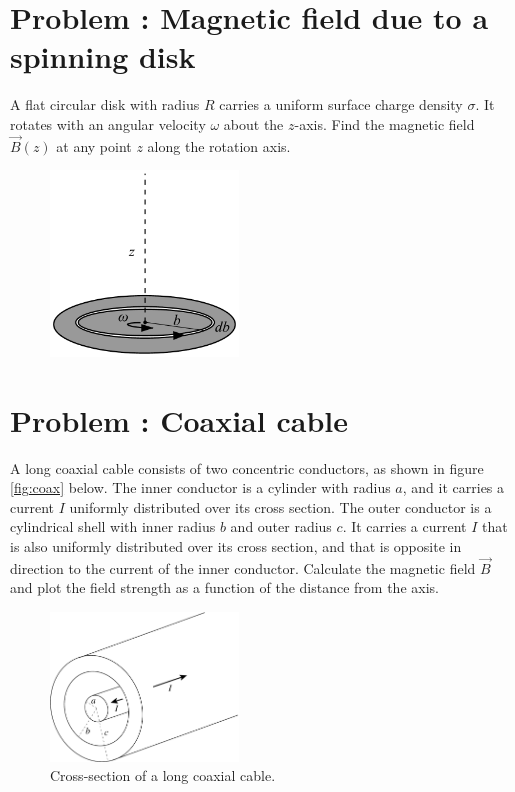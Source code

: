 \documentclass[problems]{esg8022pset}
\begin{document}
\section{Problem \thesection: Magnetic field due to a spinning disk}
  A flat circular disk with radius $R$ carries a uniform surface charge density
  $\sigma$. It rotates with an angular velocity $\omega$ about the $z$-axis.
  Find the magnetic field $\vec{B}(z)$ at any point $z$ along the rotation
  axis.

    \begin{figure}[H]
    \centering
    \includegraphics[width = 5cm]{Spinningdisk}
  \end{figure}
\section{Problem \thesection: Coaxial cable}
  A long coaxial cable consists of two concentric conductors, as shown in figure
  \autoref{fig:coax} below.  The inner conductor is a cylinder with radius $a$,
  and it carries a current $I$ uniformly distributed over its cross section.
  The outer conductor is a cylindrical shell with inner radius $b$ and outer
  radius $c$. It carries a current $I$ that is also uniformly distributed over
  its cross section, and that is opposite in direction to the current of the
  inner conductor.  Calculate the magnetic field $\vec{B}$  and plot the field
  strength as a function of the distance from the axis.
  \begin{figure}[H]
    \centering
    \includegraphics[width = 5cm]{coax}
    \caption{Cross-section of a long coaxial cable.}
    \label{fig:coax}
  \end{figure}
\end{document}

